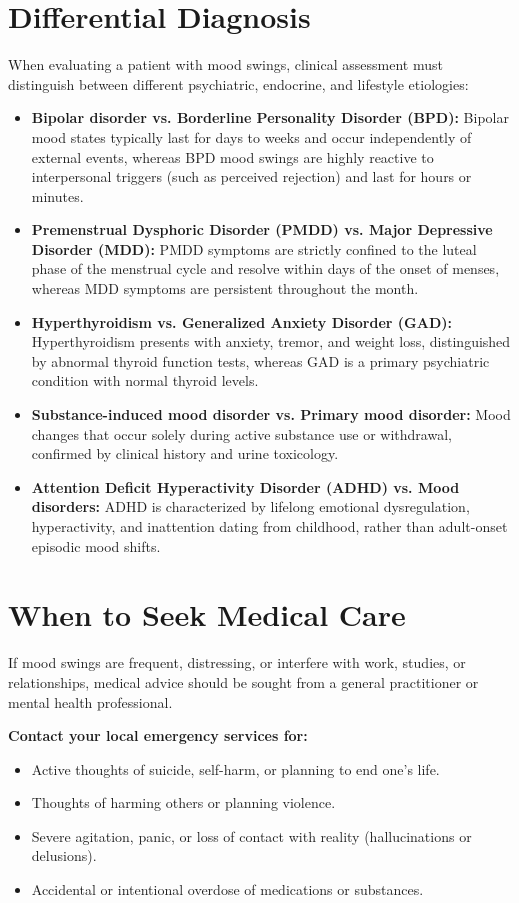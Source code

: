 \section*{Differential Diagnosis}
When evaluating a patient with mood swings, clinical assessment must distinguish between different psychiatric, endocrine, and lifestyle etiologies:
\begin{itemize}
    \item \textbf{Bipolar disorder vs. Borderline Personality Disorder (BPD):} Bipolar mood states typically last for days to weeks and occur independently of external events, whereas BPD mood swings are highly reactive to interpersonal triggers (such as perceived rejection) and last for hours or minutes.
    \item \textbf{Premenstrual Dysphoric Disorder (PMDD) vs. Major Depressive Disorder (MDD):} PMDD symptoms are strictly confined to the luteal phase of the menstrual cycle and resolve within days of the onset of menses, whereas MDD symptoms are persistent throughout the month.
    \item \textbf{Hyperthyroidism vs. Generalized Anxiety Disorder (GAD):} Hyperthyroidism presents with anxiety, tremor, and weight loss, distinguished by abnormal thyroid function tests, whereas GAD is a primary psychiatric condition with normal thyroid levels.
    \item \textbf{Substance-induced mood disorder vs. Primary mood disorder:} Mood changes that occur solely during active substance use or withdrawal, confirmed by clinical history and urine toxicology.
    \item \textbf{Attention Deficit Hyperactivity Disorder (ADHD) vs. Mood disorders:} ADHD is characterized by lifelong emotional dysregulation, hyperactivity, and inattention dating from childhood, rather than adult-onset episodic mood shifts.
\end{itemize}

\section*{When to Seek Medical Care}
If mood swings are frequent, distressing, or interfere with work, studies, or relationships, medical advice should be sought from a general practitioner or mental health professional.

\textbf{Contact your local emergency services for:}
\begin{itemize}
    \item Active thoughts of suicide, self-harm, or planning to end one's life.
    \item Thoughts of harming others or planning violence.
    \item Severe agitation, panic, or loss of contact with reality (hallucinations or delusions).
    \item Accidental or intentional overdose of medications or substances.
\end{itemize}

